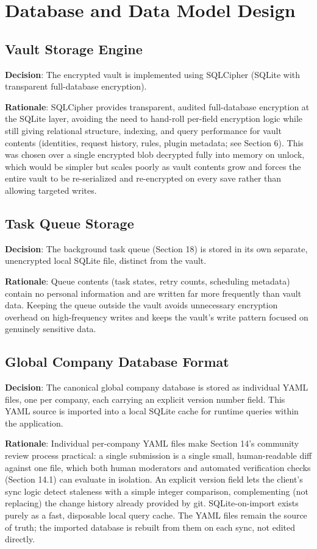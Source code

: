 \chapter{Database and Data Model Design}

\section{Vault Storage Engine}
\textbf{Decision}:  The encrypted vault is implemented using SQLCipher (SQLite with transparent full-database encryption).

\textbf{Rationale}:  SQLCipher provides transparent, audited full-database encryption at the SQLite layer, avoiding the need to hand-roll per-field encryption logic while still giving relational structure, indexing, and query performance for vault contents (identities, request history, rules, plugin metadata; see Section 6). This was chosen over a single encrypted blob decrypted fully into memory on unlock, which would be simpler but scales poorly as vault contents grow and forces the entire vault to be re-serialized and re-encrypted on every save rather than allowing targeted writes.
\section{Task Queue Storage}
\textbf{Decision}:  The background task queue (Section 18) is stored in its own separate, unencrypted local SQLite file, distinct from the vault.

\textbf{Rationale}:  Queue contents (task states, retry counts, scheduling metadata) contain no personal information and are written far more frequently than vault data. Keeping the queue outside the vault avoids unnecessary encryption overhead on high-frequency writes and keeps the vault's write pattern focused on genuinely sensitive data.
\section{Global Company Database Format}
\textbf{Decision}:  The canonical global company database is stored as individual YAML files, one per company, each carrying an explicit version number field. This YAML source is imported into a local SQLite cache for runtime queries within the application.

\textbf{Rationale}:  Individual per-company YAML files make Section 14's community review process practical: a single submission is a single small, human-readable diff against one file, which both human moderators and automated verification checks (Section 14.1) can evaluate in isolation. An explicit version field lets the client's sync logic detect staleness with a simple integer comparison, complementing (not replacing) the change history already provided by git. SQLite-on-import exists purely as a fast, disposable local query cache. The YAML files remain the source of truth; the imported database is rebuilt from them on each sync, not edited directly.
